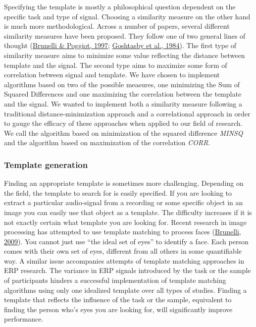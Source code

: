 \documentclass[
  man,floatsintext]{apa7}
\begin{document}
Specifying the template is mostly a philosophical question dependent on the specific task and type of signal. Choosing a similarity measure on the other hand is much more methodological. Across a number of papers, several different similarity measures have been proposed. They follow one of two general lines of thought (\protect\hyperlink{ref-brunelli1997template}{Brunelli \& Poggiot, 1997}; \protect\hyperlink{ref-goshtasby1984two}{Goshtasby et al., 1984}). The first type of similarity measure aims to minimize some value reflecting the distance between template and the signal. The second type aims to maximize some form of correlation between signal and template. We have chosen to implement algorithms based on two of the possible measures, one minimizing the Sum of Squared Differences and one maximizing the correlation between the template and the signal. We wanted to implement both a similarity measure following a traditional distance-minimization approach and a correlational approach in order to gauge the efficacy of these approaches when applied to our field of research. We call the algorithm based on minimization of the squared difference \emph{MINSQ} and the algorithm based on maximization of the correlation \emph{CORR}.

\hypertarget{template-generation}{%
\subsubsection{Template generation}\label{template-generation}}

Finding an appropriate template is sometimes more challenging. Depending on the field, the template to search for is easily specified. If you are looking to extract a particular audio-signal from a recording or some specific object in an image you can easily use that object as a template. The difficulty increases if it is not exactly certain what template you are looking for. Recent research in image processing has attempted to use template matching to process faces (\protect\hyperlink{ref-brunelli2009template}{Brunelli, 2009}). You cannot just use ``the ideal set of eyes'' to identify a face. Each person comes with their own set of eyes, different from all others in some quantifiable way. A similar issue accompanies attempts of template matching approaches in ERP research. The variance in ERP signals introduced by the task or the sample of participants hinders a successful implementation of template matching algorithms using only one idealized template over all types of studies. Finding a template that reflects the influence of the task or the sample, equivalent to finding the person who's eyes you are looking for, will significantly improve performance.
\end{document}
